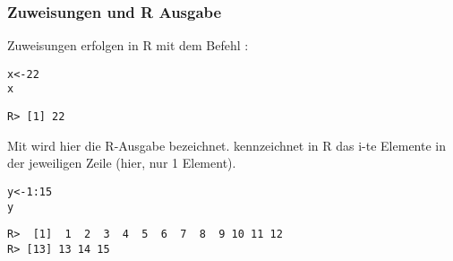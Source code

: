 \begin{frame}[fragile]\frametitle{Zuweisungen und R Ausgabe}

  Zuweisungen erfolgen in R mit dem Befehl \code{<-}:




\begin{knitrout}
\color{fgcolor}\begin{kframe}
\begin{alltt}
x <- 22
x
\end{alltt}
\begin{verbatim}
R> [1] 22
\end{verbatim}
\end{kframe}
\end{knitrout}


Mit  wird hier die R-Ausgabe bezeichnet. \code{[1]} kennzeichnet in R das
i-te Elemente in der jeweiligen Zeile (hier, nur 1 Element).

\begin{knitrout}
\color{fgcolor}\begin{kframe}
\begin{alltt}
y <- 1:15
y
\end{alltt}
\begin{verbatim}
R>  [1]  1  2  3  4  5  6  7  8  9 10 11 12
R> [13] 13 14 15
\end{verbatim}
\end{kframe}
\end{knitrout}


\end{frame}



